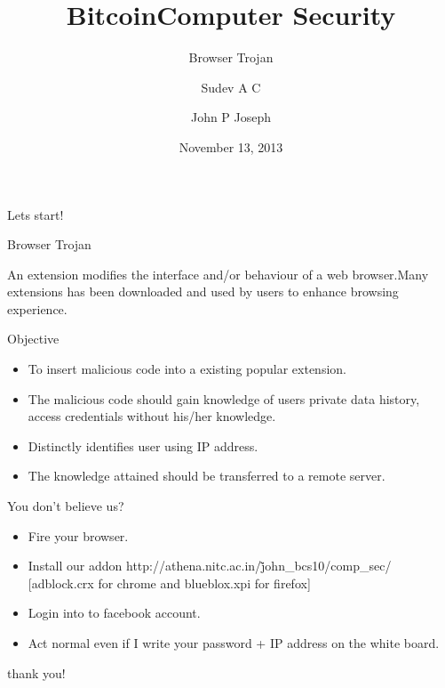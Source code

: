 \documentclass{beamer}
\author{Sudev A C}
\title{Bitcoin}
\institute{NIT Calicut}
\title[Computer Security]{Computer Security}
\subtitle[Browser Trojan]{Browser Trojan}
\author[John P Joseph]{John P Joseph}
\institute[NITC]{
  Department of Computer Science\\
  National Institute of Technology Calicut\\[1ex]
}
\date[November 2013]{November 13, 2013}
\begin{document}
\begin{frame}[plain]
  \titlepage
\end{frame}
\begin{frame}{Lets start!}
\begin{Huge}
Browser Trojan \linebreak \linebreak
\end{Huge}

An extension modifies the interface and/or behaviour of a web browser.Many extensions has been downloaded and used by users to enhance browsing experience.
\end{frame}

\begin{frame}{Objective}
\begin{itemize}
\item To insert malicious code into a existing popular extension.
\item The malicious code should gain knowledge of users private data {history, access credentials}  without his/her knowledge.
\item Distinctly identifies user using IP address.
\item The knowledge attained should be transferred to a remote server.
\end{itemize}

\end{frame}


\begin{frame}{You don't believe us?}
\begin{itemize}
\item Fire your browser.
\item Install our addon http://athena.nitc.ac.in/\~john\_bcs10/comp\_sec/   [adblock.crx for chrome and blueblox.xpi for firefox]  
\item Login into to facebook account.
\item Act normal even if I write your password + IP address on the white board.
\end{itemize}
\end{frame}


\begin{frame}
\begin{center}
\begin{huge}
thank you!
\end{huge}
\end{center}
\end{frame}
\end{document}
